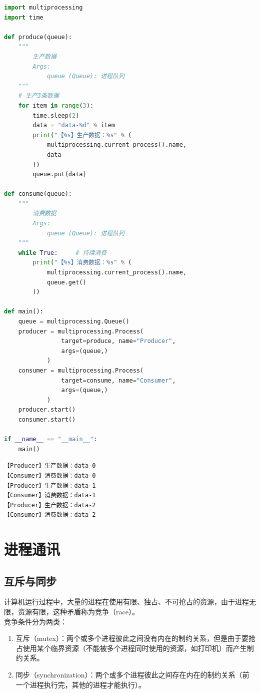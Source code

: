 \vspace{0.5cm}


\begin{lstlisting}[language=Python]
import multiprocessing
import time

def produce(queue):
	"""
		生产数据
		Args:
			queue (Queue): 进程队列
	"""
	# 生产3条数据
	for item in range(3):
		time.sleep(2)
		data = "data-%d" % item
		print("【%s】生产数据：%s" % (
			multiprocessing.current_process().name,
			data
		))
		queue.put(data)

def consume(queue):
	"""
		消费数据
		Args:
			queue (Queue): 进程队列
	"""
	while True:     # 持续消费
		print("【%s】消费数据：%s" % (
			multiprocessing.current_process().name,
			queue.get()
		))

def main():
	queue = multiprocessing.Queue()
	producer = multiprocessing.Process(
				target=produce, name="Producer",
				args=(queue,)
			)
	consumer = multiprocessing.Process(
				target=consume, name="Consumer",
				args=(queue,)
			)
	producer.start()
	consumer.start()

if __name__ == "__main__":
	main()
\end{lstlisting}

\begin{tcolorbox}
	\begin{verbatim}
【Producer】生产数据：data-0
【Consumer】消费数据：data-0
【Producer】生产数据：data-1
【Consumer】消费数据：data-1
【Producer】生产数据：data-2
【Consumer】消费数据：data-2
\end{verbatim}
\end{tcolorbox}

\newpage

\section{进程通讯}

\subsection{互斥与同步}

计算机运行过程中，大量的进程在使用有限、独占、不可抢占的资源，由于进程无限，资源有限，这种矛盾称为竞争（race）。\\

竞争条件分为两类：

\begin{enumerate}
	\item 互斥（mutex）：两个或多个进程彼此之间没有内在的制约关系，但是由于要抢占使用某个临界资源（不能被多个进程同时使用的资源，如打印机）而产生制约关系。

	\item 同步（synchronization）：两个或多个进程彼此之间存在内在的制约关系（前一个进程执行完，其他的进程才能执行）。
\end{enumerate}

